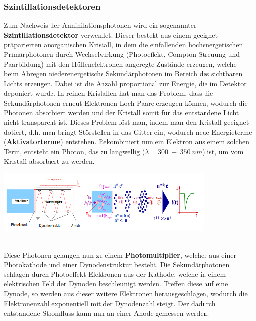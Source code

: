 \subsubsection{Szintillationsdetektoren}
	Zum Nachweis der Annihilationsphotonen wird ein sogenannter \textbf{Szintillationsdetektor} verwendet. Dieser besteht aus einem geeignet präparierten anorganischen Kristall, in dem die einfallenden hochenergetischen Primärphotonen durch Wechselwirkung (Photoeffekt, Compton-Streuung und Paarbildung) mit den Hüllenelektronen angeregte Zustände erzeugen, welche beim Abregen niederenergetische Sekundärphotonen im Bereich des sichtbaren Lichts erzeugen. Dabei ist die Anzahl proportional zur Energie, die im Detektor deponiert wurde. In reinen Kristallen hat man das Problem, dass die Sekundärphotonen erneut Elektronen-Loch-Paare erzeugen können, wodurch die Photonen absorbiert werden und der Kristall somit für das entstandene Licht nicht transparent ist. Dieses Problem löst man, indem man den Kristall geeignet dotiert, d.h. man bringt Störstellen in das Gitter ein, wodurch neue Energieterme (\textbf{Aktivatorterme}) entstehen. Rekombiniert nun ein Elektron aus einem solchen Term, entsteht ein Photon, das zu langwellig ($\lambda = 300\ -\ 350\ \unit{nm}$) ist, um vom Kristall absorbiert zu werden.\\
	\minipanf
				\begin{center}
					\includegraphics[width=0.8\textwidth, height=0.15\textheight]{pic/szintillator.png}
					\label{PET-Prinzip}
				\end{center}
				\hspace{2mm}
	\minipend\\ 
	Diese Photonen gelangen nun zu einem \textbf{Photomultiplier}, welcher aus einer Photokathode und einer Dynodenstruktur besteht. Die Sekundärphotonen schlagen durch  Photoeffekt Elektronen aus der Kathode, welche in einem elektrischen Feld der Dynoden beschleunigt werden. Treffen diese auf eine Dynode, so werden aus dieser weitere Elektronen herausgeschlagen, wodurch die Elektronenzahl exponentiell mit der Dynodenzahl steigt. Der dadurch entstandene Stromfluss kann nun an einer Anode gemessen werden.\cite{info}


